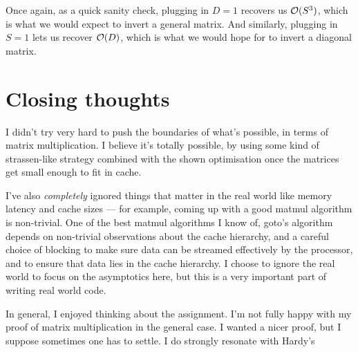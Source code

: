 \documentclass[11pt]{article}
\begin{document}
Once again, as a quick sanity check, plugging in $D = 1$ recovers us $\mathcal{O}(S^3)$, which
is what we would expect to invert a general matrix. And similarly, plugging in
$S = 1$ lets us recover $\mathcal{O}(D)$, which is what we would hope for to invert
a diagonal matrix.

\section{Closing thoughts}
I didn't try very hard to push the boundaries of what's possible, in terms 
of matrix multiplication. I believe it's totally possible, by using some kind
of strassen-like strategy combined with the shown optimisation once the
matrices get small enough to fit in cache.

I've also \textit{completely} ignored things that matter in the real world
like memory latency and cache sizes --- for example, coming up with a good
matmul algorithm is non-trivial. One of the best matmul algorithms I know of,
goto's algorithm depends on non-trivial observations about the cache hierarchy,
and a careful choice of blocking to make sure data can be streamed effectively
by the processor, and to ensure that data lies in the cache hierarchy. I
choose to ignore the real world to focus on the asymptotics here, but this
is a very important part of writing real world code.

In general, I enjoyed thinking about the assignment. I'm not fully happy with
my proof of matrix multiplication in the general case. I wanted a nicer proof,
but I suppose sometimes one has to settle. I do strongly resonate with Hardy's
\end{document}

